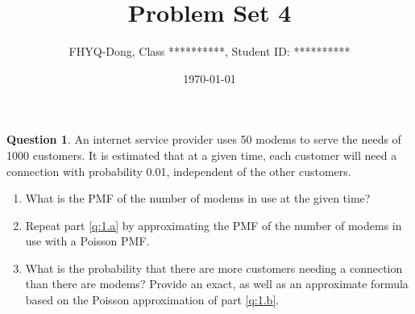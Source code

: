 \documentclass[utf8]{article}
\title{Problem Set 4}
\author{ FHYQ-Dong, Class **********, Student ID: ********** }
\date{\today}
\theoremstyle{definition}%
\newtheorem{question}{Question} %
\theoremstyle{plain}%
\begin{document}
\maketitle
\thispagestyle{fancy}


\begin{question}
    An internet service provider uses 50 modems to serve the needs of 1000 customers. It is estimated that at a given time, each customer will need a connection with probability 0.01, independent of the other customers.
    \begin{enumerate}[label=(\alph*)]
        \item \label{q:1.a} What is the PMF of the number of modems in use at the given time?
        \item \label{q:1.b} Repeat part \ref{q:1.a} by approximating the PMF of the number of modems in use with a Poisson PMF.
        \item What is the probability that there are more customers needing a connection than there are modems? Provide an exact, as well as an approximate formula based on the Poisson approximation of part \ref{q:1.b}.
    \end{enumerate}
\end{question}
\end{document}
